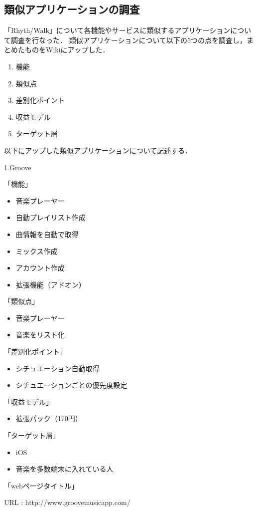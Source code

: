 \subsection{類似アプリケーションの調査}

\par 
 「Rhyth/Walk」について各機能やサービスに類似するアプリケーションについて調査を行なった．
類似アプリケーションについて以下の5つの点を調査し，まとめたものをWikiにアップした．
\begin{enumerate}
\item 機能
\item 類似点
\item 差別化ポイント
\item 収益モデル
\item ターゲット層
\end{enumerate}
\per
以下にアップした類似アプリケーションについて記述する．
\par
1.Groove
\par
「機能」
\begin{itemize}
\item 音楽プレーヤー
\item 自動プレイリスト作成
\item 曲情報を自動で取得
\item ミックス作成
\item アカウント作成
\item 拡張機能（アドオン）
\end{itemize}

「類似点」
\begin{itemize}
\item 音楽プレーヤー
\item 音楽をリスト化
\end{itemize}

「差別化ポイント」
\begin{itemize}
\item シチュエーション自動取得
\item シチュエーションごとの優先度設定
\end{itemize}

「収益モデル」
\begin{itemize}
\item 拡張パック（170円）
\end{itemize}

「ターゲット層」
\begin{itemize}
\item iOS
\item 音楽を多数端末に入れている人
\end{itemize}
「webページタイトル」
\par
URL : http://www.groovemusicapp.com/


